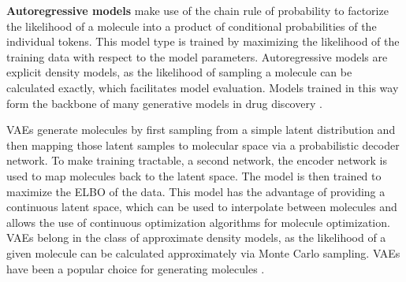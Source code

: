 \textbf{Autoregressive models} make use of the chain rule of probability to factorize the likelihood
of a molecule into a product of conditional probabilities of the individual tokens. This model type
is trained by maximizing the likelihood of the training data with respect to the model parameters.
Autoregressive models are explicit density models, as the likelihood of sampling a molecule can be
calculated exactly, which facilitates model evaluation. Models trained in this way form the backbone
of many generative models in drug discovery
\citep{gomez-bombarelliAutomaticChemicalDesign2018,seglerGeneratingFocusedMolecule2018,olivecronaMolecularDenovoDesign2017,guoAugmentedMemoryCapitalizing2023,thomasAugmentedHillClimbIncreases2022,jaquesSequenceTutorConservative2016,cohen-karlikOvercomingOrderAutoregressive2024}.

\Acp{VAE} \citep{kingmaAutoEncodingVariationalBayes2013} generate molecules by first sampling from a
simple latent distribution and then mapping those latent samples to molecular space via a
probabilistic decoder network. To make training tractable, a second network, the encoder network is
used to map molecules back to the latent space. The model is then trained to maximize the \ac{ELBO}
of the data.
This model has the advantage of providing a continuous latent space, which can be used to
interpolate between molecules and allows the use of continuous optimization algorithms for molecule
optimization. \acp{VAE} belong in the class of approximate density models, as the likelihood of a
given molecule can be calculated approximately via Monte Carlo sampling. \acp{VAE} have been a
popular choice for generating molecules
\citep{gomez-bombarelliAutomaticChemicalDesign2018,kusnerGrammarVariationalAutoencoder2017,simonovskyGraphVAEGenerationSmall2018,samantaNeVAEDeepGenerative2018,jinJunctionTreeVariational2018,daiSyntaxDirectedVariationalAutoencoder2018,liuConstrainedGraphVariational2018}.

